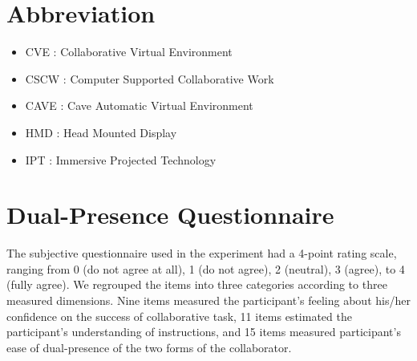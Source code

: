 \begin{appendices}
\appendixpage
\noappendicestocpagenum
\addappheadtotoc

\chapter{Abbreviation}
\label{appendix:abbreviation}
\begin{multicols}{2}
\begin{itemize}
	\item CVE : Collaborative Virtual Environment
	\item CSCW : Computer Supported Collaborative Work
	\item CAVE : Cave Automatic Virtual Environment
	\item HMD : Head Mounted Display
	\item IPT : Immersive Projected Technology
\end{itemize}
\end{multicols}


\chapter{Dual-Presence Questionnaire}
The subjective questionnaire used in the experiment had a 4-point rating scale, ranging from 0 (do not agree at all), 1 (do not agree), 2 (neutral), 3 (agree), to 4 (fully agree). We regrouped the items into three categories according to three measured dimensions. Nine items measured the participant's feeling about his/her confidence on the success of collaborative task, 11 items estimated the participant's understanding of instructions, and 15 items measured participant's ease of dual-presence of the two forms of the collaborator.


\end{appendices}
